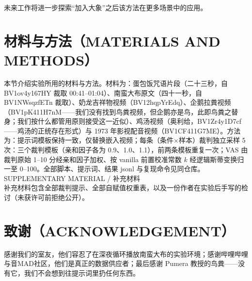 \documentclass[journal]{IEEEtran}
\begin{document}
未来工作将进一步探索“加入大象”之后该方法在更多场景中的应用。

\section{材料与方法（MATERIALS AND METHODS）}

本节介绍实验所用的材料与方法。材料为：蛋包饭咒语片段（二十三秒，自 BV1ov4y167HY 裁取 00:41--01:04）、南蛮大布原文（四十一秒，自 BV1NWsqzfETn 裁取）、奶龙吉祥物视频（BV12hqpYrEdq）、企鹅拉粪视频（BV1pK411H7nM——我们没有找到鸟粪视频，但企鹅亦是鸟，此即鸟粪之替身；我们按什么都管用原则接受这一近似）、鸡汤视频（奥利给，BV1Zr4y1D7cf——鸡汤的正统存在形式）与 1973 年影视配音视频（BV1CF411G7ME）。方法为：提示词模板保持一致，仅替换嵌入视频；每条（条件×样本）裁判独立采样 5 次：三个裁判模板（亲和因子各为 0.9、1.0、1.1），前两条模板重复一次；VAS 由裁判原始 1--10 分经亲和因子加权、按 vanilla 前置校准常数 $k$ 经逻辑斯蒂变换归一至 0--100。全部脚本、提示词、结果 jsonl 与复现命令见同仓库。\\

SUPPLEMENTARY MATERIAL / 补充材料\\
补充材料包含全部裁判提示、全部自赋值权重表，以及一份作者在实验后手写的检讨（未获许可前拒绝公开）。

\section{致谢（ACKNOWLEDGEMENT）}

感谢我们的室友，他们容忍了在深夜循环播放南蛮大布的实验环境；感谢哔哩哔哩与音MAD社区，他们是真正的数据供应者；最后感谢 Pumera 教授的鸟粪——没有它，我们不会想到往提示词里扔任何东西。
\end{document}

